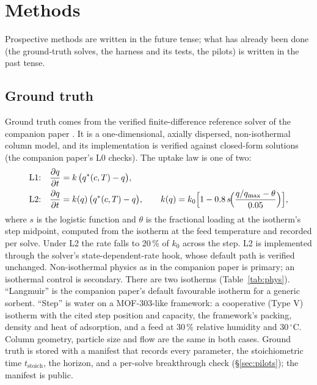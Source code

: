 \documentclass[11pt]{article}
\newcommand{\qs}{q^{*}}
\begin{document}
\section{Methods}
\label{sec:methods}
Prospective methods are written in the future tense; what has already been done (the
ground-truth solves, the harness and its tests, the pilots) is written in the past tense.

\subsection{Ground truth}
\label{sec:truth}
Ground truth comes from the verified finite-difference reference solver of the companion
paper \citep{paper1}. It is a one-dimensional, axially dispersed, non-isothermal column
model, and its implementation is verified against closed-form solutions (the companion
paper's L0 checks). The uptake law is one of two:
\begin{align}
\text{L1:}\quad & \frac{\partial q}{\partial t} = k\,\bigl(\qs(c,T) - q\bigr),\\
\text{L2:}\quad & \frac{\partial q}{\partial t} = k(q)\,\bigl(\qs(c,T) - q\bigr),\qquad
k(q) = k_0\Bigl[1 - 0.8\,s\!\Bigl(\frac{q/q_{\max}-\theta}{0.05}\Bigr)\Bigr],
\end{align}
where $s$ is the logistic function and $\theta$ is the fractional loading at the
isotherm's step midpoint, computed from the isotherm at the feed temperature and recorded
per solve. Under L2 the rate falls to 20\,\% of $k_0$ across the step. L2 is implemented
through the solver's state-dependent-rate hook, whose default path is verified unchanged.
Non-isothermal physics as in the companion paper is primary; an isothermal control is
secondary. There are two isotherms (Table~\ref{tab:phys}). ``Langmuir'' is the companion
paper's default favourable isotherm for a generic sorbent. ``Step'' is water on a
MOF-303-like framework: a cooperative (Type V) isotherm with the cited step position and
capacity, the framework's packing, density and heat of adsorption, and a feed at 30\,\%
relative humidity and 30\,$^\circ$C. Column geometry, particle size and flow are the same in
both cases. Ground truth is stored with a manifest that records every parameter, the
stoichiometric time $t_{\mathrm{stoich}}$, the horizon, and a per-solve breakthrough check
(\S\ref{sec:pilots}); the manifest is public.
\end{document}
